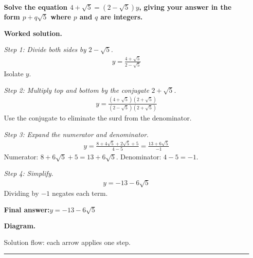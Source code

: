\documentclass[11pt]{article}
\newcommand{\question}[1]{\par\medskip\noindent\textbf{#1}\par}
\begin{document}
\question{Solve the equation \( 4 + \sqrt{5} = (2 - \sqrt{5})y \), giving your answer in the form \( p + q\sqrt{5} \) where \( p \) and \( q \) are integers.}

\textbf{Worked solution.}

\textit{Step 1: Divide both sides by \( 2 - \sqrt{5} \).}
\[\begin{gathered}
y = \frac{4 + \sqrt{5}}{2 - \sqrt{5}}
\end{gathered}\]
Isolate \( y \).

\textit{Step 2: Multiply top and bottom by the conjugate \( 2 + \sqrt{5} \).}
\[\begin{gathered}
y = \frac{(4 + \sqrt{5})(2 + \sqrt{5})}{(2 - \sqrt{5})(2 + \sqrt{5})}
\end{gathered}\]
Use the conjugate to eliminate the surd from the denominator.

\textit{Step 3: Expand the numerator and denominator.}
\[\begin{gathered}
y = \frac{8 + 4\sqrt{5} + 2\sqrt{5} + 5}{4 - 5} = \frac{13 + 6\sqrt{5}}{-1}
\end{gathered}\]
Numerator: \( 8 + 6\sqrt{5} + 5 = 13 + 6\sqrt{5} \). Denominator: \( 4 - 5 = -1 \).

\textit{Step 4: Simplify.}
\[\begin{gathered}
y = -13 - 6\sqrt{5}
\end{gathered}\]
Dividing by \( -1 \) negates each term.

\begin{answerbox}
\textbf{Final answer:}\quad \(\displaystyle y = -13 - 6\sqrt{5}\)
\end{answerbox}
\textbf{Diagram.}

\begin{center}
\end{center}
\small Solution flow: each arrow applies one step.\normalsize

\medskip\hrule
\end{document}
